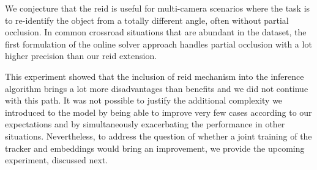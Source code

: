 We conjecture that the \gls{reid} is useful for multi-camera scenarios where the task is to re-identify the object from a totally different angle, often without partial occlusion. In common crossroad situations that are abundant in the \uadetrac{} dataset, the first formulation of the online solver approach handles partial occlusion with a lot higher precision than our \gls{reid} extension.

This experiment showed that the inclusion of \gls{reid} mechanism into the inference algorithm brings a lot more disadvantages than benefits and we did not continue with this path. It was not possible to justify the additional complexity we introduced to the model by being able to improve very few cases according to our expectations and by simultaneously exacerbating the performance in other situations. Nevertheless, to address the question of whether a joint training of the tracker and embeddings would bring an improvement, we provide the upcoming experiment, discussed next.
